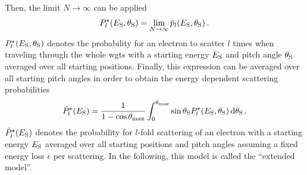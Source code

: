 Then, the limit $N\rightarrow\infty$ can be applied
\begin{equation}
P^{\star}_l(E_\mathrm{S},\theta_\mathrm{S}) = 
\lim_{N\rightarrow\infty} \bar{p}_l(E_\mathrm{S},\theta_\mathrm{S})
\text{\,.}
\label{eq:eDepScatCrossSecExtendedModelFormalismPitchAngleDepScatProbs}
\end{equation}
$P^{\star}_l(E_\mathrm{S},\theta_\mathrm{S})$ denotes the probability for an electron to scatter $l$ times when traveling through the whole \gls{wgts} with a starting energy $E_\mathrm{S}$ and pitch angle $\theta_\mathrm{S}$ averaged over all starting positions. Finally, this expression can be averaged over all starting pitch angles in order to obtain the energy dependent scattering probabilities
\begin{equation}
\bar{P}^{\star}_l(E_\mathrm{S}) = 
\frac{1}{1-\cos\theta_\mathrm{max}}
\int_0^{\theta_\mathrm{max}}
\sin \theta_\mathrm{S}
P^{\star}_l(E_\mathrm{S},\theta_\mathrm{S}) 
\mathop{}\!\mathrm{d} \theta_\mathrm{S}
\text{\,.}
\label{eq:eDepScatCrossSecExtendedModelFormalismAveragedDepScatProbs}
\end{equation}
$\bar{P}^{\star}_l(E_\mathrm{S})$ denotes the probability for $l$-fold scattering of an electron with a starting energy $E_\mathrm{S}$ averaged over all starting positions and pitch angles assuming a fixed energy loss $\epsilon$ per scattering. In the following, this model is called the ``extended model''.

